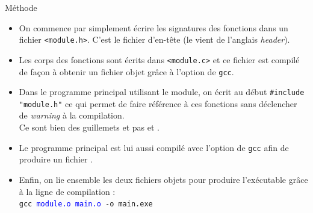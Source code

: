 \documentclass[10pt]{beamer}
\begin{document}
\begin{frame}[fragile]{\Ctitle}{\stitle}
	\begin{alertblock}{Méthode}
		\begin{itemize}
			\item<2-> On commence par simplement écrire les signatures des fonctions dans un fichier {\tt <module.h>}. C'est le fichier d'en-tête (le  vient de l'anglais \textit{header}).
			\item<3-> Les corps des fonctions sont écrits dans {\tt <module.c>} et ce fichier est compilé de façon à obtenir un fichier objet  grâce à l'option  de {\tt gcc}.
			\item<4-> Dans le programme principal utilisant le module, on écrit au début \texttt{#include "module.h"} ce qui permet de faire référence à ces fonctions sans déclencher de \textit{warning} à la compilation. \\
				\onslide<5->\textcolor{BrickRed}{\small \danger} Ce sont bien des guillemets et pas \kw{<} et \kw{>}. \\
			\item<5-> Le programme principal est lui aussi compilé avec l'option  de {\tt gcc} afin de produire un fichier .
			\item<6-> Enfin, on lie ensemble les deux fichiers objets pour produire l'exécutable grâce à la ligne de compilation :\\
				\onslide<6-> {\tt gcc \textcolor{blue}{module.o  main.o} -o main.exe}
		\end{itemize}
	\end{alertblock}
\end{frame}
\end{document}

